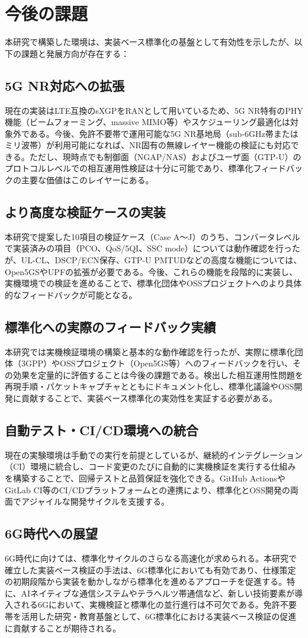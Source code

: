 \section{今後の課題}

本研究で構築した環境は、実装ベース標準化の基盤として有効性を示したが、以下の課題と発展方向が存在する：

\subsection{5G NR対応への拡張}
現在の実装はLTE互換のsXGPをRANとして用いているため、5G NR特有のPHY機能（ビームフォーミング、massive MIMO等）やスケジューリング最適化は対象外である。今後、免許不要帯で運用可能な5G NR基地局（sub-6GHz帯またはミリ波帯）が利用可能になれば、NR固有の無線レイヤー機能の検証にも対応できる。ただし、現時点でも制御面（NGAP/NAS）およびユーザ面（GTP-U）のプロトコルレベルでの相互運用性検証は十分に可能であり、標準化フィードバックの主要な価値はこのレイヤーにある。

\subsection{より高度な検証ケースの実装}
本研究で提案した10項目の検証ケース（Case A～J）のうち、コンバータレベルで実装済みの項目（PCO、QoS/5QI、SSC mode）については動作確認を行ったが、UL-CL、DSCP/ECN保存、GTP-U PMTUDなどの高度な機能については、Open5GSやUPFの拡張が必要である。今後、これらの機能を段階的に実装し、実機環境での検証を進めることで、標準化団体やOSSプロジェクトへのより具体的なフィードバックが可能となる。

\subsection{標準化への実際のフィードバック実績}
本研究では実機検証環境の構築と基本的な動作確認を行ったが、実際に標準化団体（3GPP）やOSSプロジェクト（Open5GS等）へのフィードバックを行い、その効果を定量的に評価することは今後の課題である。検出した相互運用性問題を再現手順・パケットキャプチャとともにドキュメント化し、標準化議論やOSS開発に貢献することで、実装ベース標準化の実効性を実証する必要がある。

\subsection{自動テスト・CI/CD環境への統合}
現在の実験環境は手動での実行を前提としているが、継続的インテグレーション（CI）環境に統合し、コード変更のたびに自動的に実機検証を実行する仕組みを構築することで、回帰テストと品質保証を強化できる。GitHub ActionsやGitLab CI等のCI/CDプラットフォームとの連携により、標準化とOSS開発の両面でアジャイルな開発サイクルを支援する。

\subsection{6G時代への展望}
6G時代に向けては、標準化サイクルのさらなる高速化が求められる。本研究で確立した実装ベース検証の手法は、6G標準化においても有効であり、仕様策定の初期段階から実装を動かしながら標準化を進めるアプローチを促進する。特に、AIネイティブな通信システムやテラヘルツ帯通信など、新しい技術要素が導入される6Gにおいて、実機検証と標準化の並行進行は不可欠である。免許不要帯を活用した研究・教育基盤として、6G標準化における実装ベース検証の促進に貢献することが期待される。

